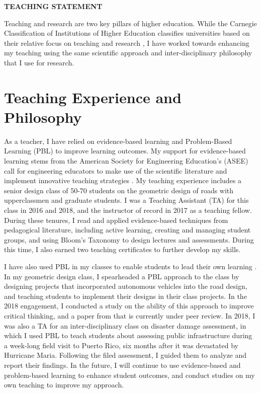 \documentclass[12pt]{article}
\begin{document}
 \sloppy %
\begin{center}
{\large \uppercase{\textbf{Teaching Statement}}}
\end{center}

Teaching and research are two key pillars of higher education. While the Carnegie Classification of Institutions of Higher Education classifies universities based on their relative focus on teaching and research \cite{carnegie1994classification}, I have worked towards enhancing my teaching using the same scientific approach and inter-disciplinary philosophy that I use for research.

\section*{Teaching Experience and Philosophy}
As a teacher, I have relied on evidence-based learning and Problem-Based Learning (PBL) to improve learning outcomes. My support for evidence-based learning stems from the American Society for Engineering Education's (ASEE) call for engineering educators to make use of the scientific literature and implement innovative teaching strategies \cite{jamieson2009creating}. My teaching experience includes a senior design class of 50-70 students on the geometric design of roads with upperclassmen and graduate students. I was a Teaching Assistant (TA) for this class in 2016 and 2018, and the instructor of record in 2017 as a teaching fellow. During these tenures, I read and applied evidence-based techniques from pedagogical literature, including active learning, creating and managing student groups, and using Bloom's Taxonomy to design lectures and assessments. During this time, I also earned two teaching certificates to further develop my skills. 

I have also used PBL in my classes to enable students to lead their own learning \cite{albanese1993problem}. In my geometric design class, I spearheaded a PBL approach to the class by designing projects that incorporated autonomous vehicles into the road design, and teaching students to implement their designs in their class projects. In the 2018 engagement, I conducted a study on the ability of this approach to improve critical thinking, and a paper from that is currently under peer review. In 2018, I was also a TA for an inter-disciplinary class on disaster damage assessment, in which I used PBL to teach students about assessing public infrastructure during a week-long field visit to Puerto Rico, six months after it was devastated by Hurricane Maria. Following the filed assessment, I guided them to analyze and report their findings. In the future, I will continue to use evidence-based and problem-based learning to enhance student outcomes, and conduct studies on my own teaching to improve my approach.
\end{document}

